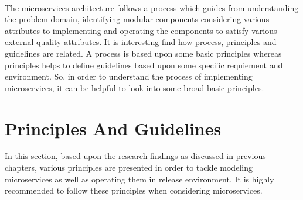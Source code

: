 \\
The microservices architecture follows a process which guides from understanding the problem domain, identifying modular components considering various attributes to implementing and operating the components to satisfy various external quality attributes. It is interesting find how process, principles and guidelines are related. A process is based upon some basic principles whereas principles helps to define guidelines based upon some specific requiement and environment. So, in order to understand the process of implementing microservices, it can be helpful to look into some broad basic principles.

\section{Principles And Guidelines}\label{section:guidelines/principles_and_guidelines}
In this section, based upon the research findings as discussed in previous chapters, various principles are presented in order to tackle modeling microservices as well as operating them in release environment. It is highly recommended to follow these principles when considering microservices.\cite{Newman:2015aa}
